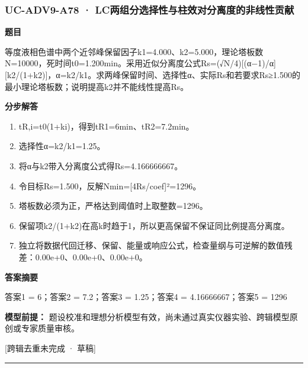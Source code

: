 \documentclass[UTF8,11pt,a4paper]{ctexart}
\begin{document}
\subsubsection*{UC-ADV9-A78 · LC两组分选择性与柱效对分离度的非线性贡献}
\noindent\textbf{题目}\par
等度液相色谱中两个近邻峰保留因子k1=4.000、k2=5.000，理论塔板数N=10000，死时间t0=1.200min。采用近似分离度公式Rs=(√N/4)[(α−1)/α][k2/(1+k2)]，α=k2/k1。求两峰保留时间、选择性α、实际Rs和若要求Rs≥1.500的最小理论塔板数；说明提高k2并不能线性提高Rs。\par
\medskip\noindent\textbf{分步解答}
\begin{enumerate}
\item tR,i=t0(1+ki)，得到tR1=6min、tR2=7.2min。
\item 选择性α=k2/k1=1.25。
\item 将α与k2带入分离度公式得Rs=4.166666667。
\item 令目标Rs=1.500，反解Nmin=[4Rs/coef]²=1296。
\item 塔板数必须为正，严格达到阈值时上取整数=1296。
\item 保留项k2/(1+k2)在高k时趋于1，所以更高保留不保证同比例提高分离度。
\item 独立将数据代回迁移、保留、能量或响应公式，检查量纲与可逆解的数值残差：0.00e+0、0.00e+0、0.00e+0。
\end{enumerate}
\noindent\textbf{答案摘要}\par
答案1 = 6；答案2 = 7.2；答案3 = 1.25；答案4 = 4.16666667；答案5 = 1296\par
\noindent\textbf{模型前提：}
题设校准和理想分析模型有效，尚未通过真实仪器实验、跨辑模型原创或专家质量审核。\par
\noindent\textcolor{red!65!black}{[跨辑去重未完成 · 草稿]} \par
\medskip\hrule\medskip
{}
\end{document}
